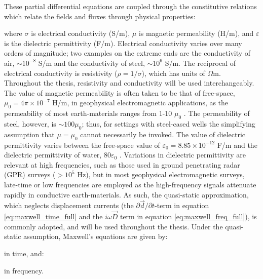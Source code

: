 These partial differential equations are coupled through the constitutive relations which relate the fields and fluxes through physical properties:

where $\sigma$ is electrical conductivity (S/m), $\mu$ is magnetic permeability (H/m), and $\varepsilon$ is the dielectric permittivity (F/m). Electrical conductivity varies over many orders of magnitude; two examples on the extreme ends are the conductivity of air, $\sim10^{-8}$ S/m and the conductivity of steel, $\sim 10^6$ S/m. The reciprocal of electrical conductivity is resistivity ($\rho = 1/\sigma$), which has units of $\Omega$m. Throughout the thesis, resistivity and conductivity will be used interchangeably. The value of magnetic permeability is often taken to be that of free-space, $\mu_0 = 4\pi\times10^{-7}$ H/m, in geophysical electromagnetic applications, as the permeability of most earth-materials ranges from 1-10 $\mu_0$ \citep{Telford1990}. The permeability of steel, however, is $\sim 100 \mu_0$; thus, for settings with steel-cased wells the simplifying assumption that $\mu=\mu_0$ cannot necessarily be invoked. The value of dielectric permittivity varies between the free-space value of $\varepsilon_0=8.85\times10^{-12}$ F/m and the dielectric permittivity of water, $80\varepsilon_0$ \citep{Telford1990}. Variations in dielectric permittivity are relevant at high frequencies, such as those used in ground penetrating radar (GPR) surveys ($> 10^5$ Hz), but in most geophysical electromagnetic surveys, late-time or low frequencies are employed as the high-frequency signals attenuate rapidly in conductive earth-materials. As such, the quasi-static approximation, which neglects displacement currents (the $\partial \vec{d} / \partial t$-term in equation \ref{eq:maxwell_time_full} and the $i\omega\vec{D}$ term in equation \ref{eq:maxwell_freq_full}), is commonly adopted, and will be used throughout the thesis. Under the quasi-static assumption, Maxwell's equations are given by:

in time, and:

 in frequency.

